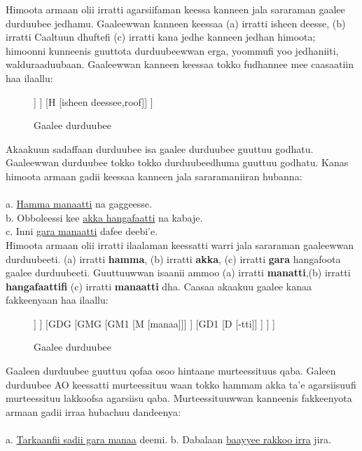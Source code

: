 \documentclass[11pt,b5paper]{book}
\begin{document}
Himoota armaan olii irratti agarsiifaman keessa kanneen jala sararaman gaalee durduubee jedhamu. Gaaleewwan kanneen
keessaa (a) irratti isheen deesse, (b) irratti Caaltuun dhuftefi (c) irratti kana jedhe kanneen jedhan himoota; himoonni kunneenis guuttota durduubeewwan erga, yoommufi yoo jedhaniiti, walduraaduubaan. Gaaleewwan kanneen keessaa tokko fudhannee mee caasaatiin haa ilaallu:

\begin{figure}[H]										
	\caption{Gaalee durduubee}
	\centering
	\begin{forest}
		[GDG
			[GD1
				[GD [erga]]
			]
			[H [isheen deessee,roof]]
		]
	\end{forest}
\end{figure}

Akaakuun sadaffaan durduubee isa gaalee durduubee guuttuu godhatu. Gaaleewwan durduubee tokko tokko
durduubeedhuma guuttuu godhatu. Kanas himoota armaan gadii keessaa kanneen jala sararamaniiran hubanna:\\
\\
a. \underline{Hamma manaatti} na gaggeesse.\\
b. Obboleessi kee \underline{akka hangafaatti} na kabaje.\\
c. Inni \underline{gara manaatti} dafee deebi’e.\\

Himoota armaan olii irratti ilaalaman keessatti warri jala sararaman gaaleewwan durduubeeti. (a) irratti \textbf{hamma}, (b) irratti \textbf{akka}, (c) irratti \textbf{gara} hangafoota gaalee durduubeeti. Guuttuuwwan isaanii ammoo (a) irratti \textbf{manatti},(b) irratti \textbf{hangafaattifi} (c) irratti \textbf{manaatti} dha. Caasaa akaakuu gaalee kanaa fakkeenyaan haa ilaallu:

\begin{figure}[H]										
	\caption{Gaalee durduubee}
	\centering
	\begin{forest}
		[GDG
			[GD1
				[D [hamma]]
			]
			[GDG
				[GMG
					 [GM1 [M [manaa]]]
				]
				[GD1
					[D [-tti]]
				]
			]
		]
	\end{forest}
\end{figure}
 
 Gaaleen durduubee guuttuu qofaa osoo hintaane  murteessituus qaba. Galeen durduubee AO keessatti  murteessituu waan tokko hammam akka ta’e agarsiisuufi  murteessituu lakkoofsa agarsiisu qaba. Murteessituuwwan  kanneenis fakkeenyota armaan gadii irraa hubachuu dandeenya:\\
 \\
 a. \underline{Tarkaanfii sadii gara manaa} deemi.
 b. Dabalaan \underline{baayyee rakkoo irra} jira.\\
 
\end{document}

